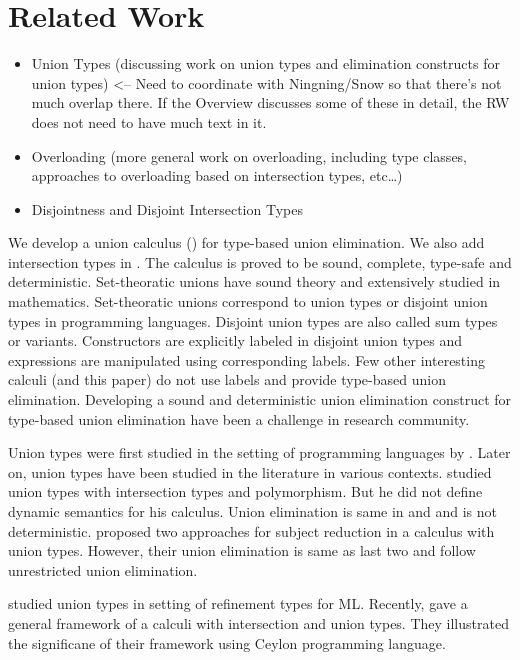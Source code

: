 \section{Related Work}
\label{sec:related}

\begin{itemize}
	\item {Union Types    (discussing work on union types and elimination constructs for union types) <-- Need to coordinate with Ningning/Snow so that there’s not much overlap there. If the Overview discusses some of these in detail, the RW does not need to have much text in it.}
	\item {Overloading (more general work on overloading, including type classes, approaches to overloading based on intersection types, etc…)}
	\item{Disjointness and Disjoint Intersection Types}
\end{itemize}

\noindent We develop a union calculus (\cal) for type-based union elimination. 
We also add intersection types in
\cal. The calculus is proved to be sound, complete, type-safe and deterministic. Set-theoratic unions have
sound theory and extensively studied in mathematics. Set-theoratic unions correspond to union types
or disjoint union types in programming languages. Disjoint union types are also called sum types or variants.
Constructors are explicitly labeled in disjoint union types and expressions are manipulated using
corresponding labels. Few other interesting calculi (and this paper) do not use labels and provide type-based
union elimination. Developing a sound and deterministic union elimination construct
for type-based union elimination have been a challenge in research community.

Union types were first studied in the setting of programming languages by 
\citet{macqueen1984ideal}. Later on, union types have been studied in
the literature in various contexts. \citep{pierce1991programming} studied union types with intersection
types and polymorphism. But he did not define dynamic semantics for his calculus. Union elimination is same
in \citep{macqueen1984ideal} and \citep{pierce1991programming} and is not deterministic.
\citet{barbanera1995intersection} proposed two approaches for subject reduction in a calculus with
union types. However, their union elimination is same as last two and follow unrestricted union
elimination.

\citet{freeman1991refinement} studied union types in setting of refinement types for ML.
 Recently, \citet{muehlboeck2018empowering} gave a general framework of a calculi with intersection and 
union types. They illustrated the significane of their framework using Ceylon programming language.

